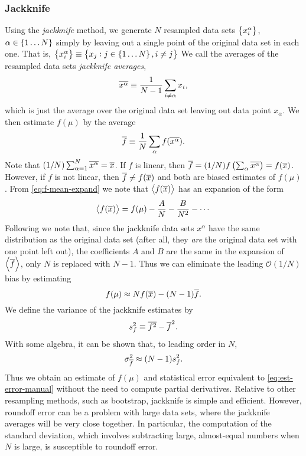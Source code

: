 \subsubsection{Jackknife}

Using the \emph{jackknife} method, we generate $N$ resampled data sets
$\cbr{x_i^{\alpha}}$, $\alpha \in \cbr{1 \dots N}$ simply by leaving out a
single point of the original data set in each one.
That is,
$\cbr{x_i^{\alpha}} \equiv \cbr{x_j:j \in \cbr{1\dots N}, i\neq j}$
We call the averages of the
resampled data sets \emph{jackknife averages},
\begin{equation}
  \overline{x^{\alpha}} \equiv \frac{1}{N-1} \sum_{i \neq \alpha} x_i,
\end{equation}
which is just the average over the original data set leaving out data point
$x_{\alpha}$. We then estimate $f(\mu)$ by the average
\begin{equation}
  \overline{f} \equiv \frac{1}{N} \sum_{\alpha} f(\overline{x^{\alpha}}).
  \label{eq:f-est-jk}
\end{equation}
Note that $(1/N) \sum_{\alpha=1}^N \overline{x^{\alpha}} = \overline{x}$.
If $f$ is linear, then
$\overline{f}=(1/N)f\left(\sum_{\alpha} \overline{x^{\alpha}}\right)=f(\overline{x})$.
However, if $f$ is not linear, then $\overline{f} \neq f(\overline{x})$ and
both are biased estimates of $f(\mu)$. From \cref{eq:f-mean-expand}
we note that $\left< f(\overline{x}) \right>$ has an expansion of the form
\begin{equation}
  \left< f(\overline{x}) \right> = f(\mu) - \frac{A}{N} - \frac{B}{N^2} - \cdots
\end{equation}
Following \textcite{young2015everything} we note that, since the jackknife
data sets $x^{\alpha}$ have the same distribution as the original data set
(after all, they \emph{are} the original data set with one point left out),
the coefficients $A$ and $B$ are the same in the expansion of
$\left< \overline{f} \right>$, only $N$ is replaced with $N-1$. Thus we can eliminate the
leading $\mathcal{O}(1/N)$ bias by estimating
\begin{equation}
  f(\mu) \approx N f(\overline{x}) - (N-1) \overline{f}.
\end{equation}
We define the variance of the jackknife estimates by
\begin{equation}
  s_f^2 \equiv \overline{f^2} - \overline{f}^2.
  \label{eq:f-var-jk}
\end{equation}
With some algebra, it can be shown that, to leading order in $N$,
\begin{equation}
  \sigma_{\overline{f}}^2 \approx (N-1) s_f^2.
  \label{eq:f-err-jk}
\end{equation}
Thus we obtain an estimate of $f(\mu)$ and statistical error equivalent to
\cref{eq:est-error-manual} without the need to compute partial derivatives.
Relative to other resampling methods, such as bootstrap, jackknife is simple
and efficient. However, roundoff error can be a problem with large data sets,
where the jackknife averages will be very close together. In particular, the
computation of the standard deviation, which involves subtracting large,
almost-equal numbers when $N$ is large, is susceptible to roundoff error.

